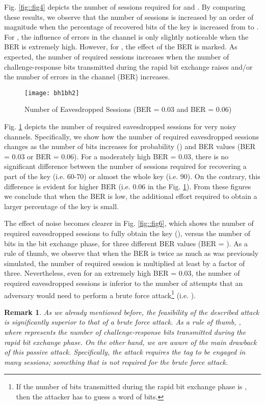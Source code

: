 \documentclass{article}
\newtheorem{remark}{Remark}
\begin{document}
Fig. \ref{fig::fig4} depicts the number of sessions required for  and . By comparing these results, we observe that the number of sessions is increased by an order of magnitude when the percentage of recovered bits of the key is increased from  to .  For , the influence of errors in the channel is only slightly noticeable when the BER is extremely high. However, for , the effect of the BER is marked. As expected, the number of required sessions increases when the number of challenge-response bits transmitted during the rapid bit exchange raises and/or the number of errors in the channel (BER) increases.

\begin{figure}
\centering
\texttt{[image: bh1bh2]}\\
  \caption{Number of Eavesdropped Sessions (BER = 0.03 and BER = 0.06)}\label{fig::fig5}
\end{figure}

Fig. \ref{fig::fig5} depicts the number of required eavesdropped sessions for very noisy channels. Specifically, we show how the number of required eavesdropped sessions changes as the number of bits increases for probability  () and BER values (BER = 0.03 or BER = 0.06).  For a moderately high BER = 0.03, there is no significant difference between the number of sessions required for recovering a part of the key (i.e. 60-70) or almost the whole key (i.e. 90). On the contrary, this difference is evident for higher  BER (i.e. 0.06 in the Fig. \ref{fig::fig5}). From these figures we conclude that when the BER is low, the additional effort required to obtain a larger percentage of the key is small.

The effect of noise becomes clearer in Fig. \ref{fig::fig6}, which shows the number of required eavesdropped sessions to fully obtain the key (), versus the number of bits in the bit exchange phase, for three different BER values (BER = ).  As a rule of thumb, we observe that when the BER is twice as much as was previously simulated, the number of required session is multiplied at least by a factor of three.  Nevertheless, even for an extremely high BER = 0.03, the number of required eavesdropped sessions is inferior to the number of attempts that an adversary would need to perform a brute force attack\footnote{If the number of bits transmitted during the rapid bit exchange phase is , then the attacker has to guess a word of  bits.} (i.e. ).\\

\begin{remark}
As we already mentioned before, the feasibility of the described attack is significantly superior to that of a brute force attack. As a rule of thumb, , where  represents the number of challenge-response bits transmitted during the rapid bit exchange phase. On the other hand,  we are aware of the main drawback of this passive attack.  Specifically,  the attack requires the tag to be engaged in many sessions; something that is not required for the brute force attack.
\end{remark}
\end{document}
